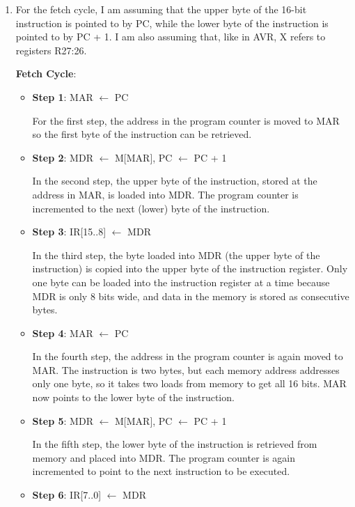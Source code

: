 \documentclass[11pt]{article}
\begin{document}
\begin{enumerate}[leftmargin=0.2in]

\item For the fetch cycle, I am assuming that the upper byte of the 16-bit instruction is pointed to by PC, while the lower byte of the instruction is pointed to by PC + 1. I am also assuming that, like in AVR, X refers to registers R27:26.

\textbf{Fetch Cycle}:
\begin{itemize}
  \item \textbf{Step 1}: MAR $\leftarrow$ PC

    For the first step, the address in the program counter is moved to MAR so the first byte of the instruction can be retrieved.

  \item \textbf{Step 2}: MDR $\leftarrow$ M[MAR], PC $\leftarrow$ PC + 1

    In the second step, the upper byte of the instruction, stored at the address in MAR, is loaded into MDR. The program counter is incremented to the next (lower) byte of the instruction.

  \item \textbf{Step 3}: IR[15..8] $\leftarrow$ MDR

    In the third step, the byte loaded into MDR (the upper byte of the instruction) is copied into the upper byte of the instruction register. Only one byte can be loaded into the instruction register at a time because MDR is only 8 bits wide, and data in the memory is stored as consecutive bytes.

  \item \textbf{Step 4}: MAR $\leftarrow$ PC
    
    In the fourth step, the address in the program counter is again moved to MAR. The instruction is two bytes, but each memory address addresses only one byte, so it takes two loads from memory to get all 16 bits. MAR now points to the lower byte of the instruction.

  \item \textbf{Step 5}: MDR $\leftarrow$ M[MAR], PC $\leftarrow$ PC + 1

    In the fifth step, the lower byte of the instruction is retrieved from memory and placed into MDR. The program counter is again incremented to point to the next instruction to be executed.

  \item \textbf{Step 6}: IR[7..0] $\leftarrow$ MDR


\end{itemize}
\end{enumerate}
\end{document}
